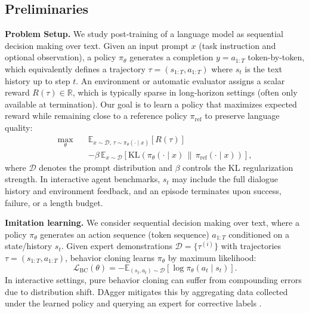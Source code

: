 \documentclass{article}
\theoremstyle{plain}
\theoremstyle{definition}
\theoremstyle{remark}
\begin{document}
\subsection{Preliminaries}
\textbf{Problem Setup.}
We study post-training of a language model as sequential decision making over text.
Given an input prompt $x$ (task instruction and optional observation), a policy $\pi_\theta$ generates a completion $y=a_{1:T}$ token-by-token, which equivalently defines a trajectory $\tau=(s_{1:T},a_{1:T})$ where $s_t$ is the text history up to step $t$.
An environment or automatic evaluator assigns a scalar reward $R(\tau)\in\mathbb{R}$, which is typically sparse in long-horizon settings (often only available at termination).
Our goal is to learn a policy that maximizes expected reward while remaining close to a reference policy $\pi_{\mathrm{ref}}$ to preserve language quality:
\begin{equation}
\begin{aligned}
\max_\theta\quad &\mathbb{E}_{x\sim\mathcal{D},\,\tau\sim\pi_\theta(\cdot\mid x)}\left[R(\tau)\right] \\
&-\beta\,\mathbb{E}_{x\sim\mathcal{D}}\left[\mathrm{KL}\left(\pi_\theta(\cdot\mid x)\,\|\,\pi_{\mathrm{ref}}(\cdot\mid x)\right)\right],
\end{aligned}
\end{equation}
where $\mathcal{D}$ denotes the prompt distribution and $\beta$ controls the KL regularization strength.
In interactive agent benchmarks, $s_t$ may include the full dialogue history and environment feedback, and an episode terminates upon success, failure, or a length budget.



\textbf{Imitation learning.}
We consider sequential decision making over text, where a policy $\pi_\theta$ generates an action sequence (token sequence) $a_{1:T}$ conditioned on a state/history $s_t$.
Given expert demonstrations $\mathcal{D}=\{\tau^{(i)}\}$ with trajectories $\tau=(s_{1:T},a_{1:T})$, behavior cloning learns $\pi_\theta$ by maximum likelihood:
\begin{equation}
\mathcal{L}_{\mathrm{BC}}(\theta)=-\mathbb{E}_{(s_t,a_t)\sim\mathcal{D}}\left[\log \pi_\theta(a_t\mid s_t)\right].
\end{equation}
In interactive settings, pure behavior cloning can suffer from compounding errors due to distribution shift.
DAgger mitigates this by aggregating data collected under the learned policy and querying an expert for corrective labels \cite{ross2011reductionimitationlearningstructured}.
\end{document}
